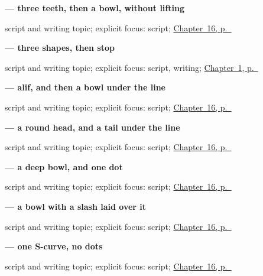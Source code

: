 \noindent\begin{minipage}[t]{\linewidth}
\raggedright
\textbf{ — three teeth, then a bowl, without lifting}\par
\footnotesize script and writing topic; explicit focus: script; \hyperref[ch:ur-script-seven]{Chapter~16, p.~\pageref*{ch:ur-script-seven}}
\end{minipage}\par\smallskip

\noindent\begin{minipage}[t]{\linewidth}
\raggedright
\textbf{   — three shapes, then stop}\par
\footnotesize script and writing topic; explicit focus: script, writing; \hyperref[ch:urdu-greetings]{Chapter~1, p.~\pageref*{ch:urdu-greetings}}
\end{minipage}\par\smallskip

\noindent\begin{minipage}[t]{\linewidth}
\raggedright
\textbf{ — alif, and then a bowl under the line}\par
\footnotesize script and writing topic; explicit focus: script; \hyperref[ch:ur-script-seven]{Chapter~16, p.~\pageref*{ch:ur-script-seven}}
\end{minipage}\par\smallskip

\noindent\begin{minipage}[t]{\linewidth}
\raggedright
\textbf{ — a round head, and a tail under the line}\par
\footnotesize script and writing topic; explicit focus: script; \hyperref[ch:ur-script-seven]{Chapter~16, p.~\pageref*{ch:ur-script-seven}}
\end{minipage}\par\smallskip

\noindent\begin{minipage}[t]{\linewidth}
\raggedright
\textbf{ — a deep bowl, and one dot}\par
\footnotesize script and writing topic; explicit focus: script; \hyperref[ch:ur-script-seven]{Chapter~16, p.~\pageref*{ch:ur-script-seven}}
\end{minipage}\par\smallskip

\noindent\begin{minipage}[t]{\linewidth}
\raggedright
\textbf{ — a bowl with a slash laid over it}\par
\footnotesize script and writing topic; explicit focus: script; \hyperref[ch:ur-script-seven]{Chapter~16, p.~\pageref*{ch:ur-script-seven}}
\end{minipage}\par\smallskip

\noindent\begin{minipage}[t]{\linewidth}
\raggedright
\textbf{ — one S-curve, no dots}\par
\footnotesize script and writing topic; explicit focus: script; \hyperref[ch:ur-script-seven]{Chapter~16, p.~\pageref*{ch:ur-script-seven}}
\end{minipage}\par\smallskip
